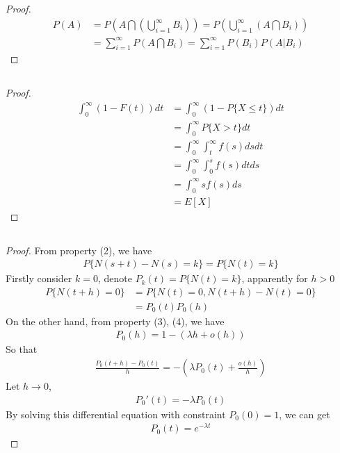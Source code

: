 \documentclass[runningheads]{llncs}
\begin{document}
    \subsection{}
    \begin{proof}
        \begin{align}
            P(A) &= P(A \bigcap (\bigcup_{i=1}^\infty B_i)) 
            = P(\bigcup_{i=1}^\infty (A \bigcap B_i)) \\
            &= \sum_{i=1}^\infty P(A \bigcap B_i)
            = \sum_{i=1}^\infty P(B_i) P(A | B_i)
        \end{align}
    \end{proof}
    \subsection{}
    \begin{proof}
        \begin{align}
            \int_0^\infty (1 - F(t))dt &= \int_0^\infty (1 - P\{ X \leq t \})dt \\
            &= \int_0^\infty P \{ X > t \}dt \\
            &= \int_0^\infty \int_t^\infty f(s)dsdt \\
            &= \int_0^\infty \int_0^s f(s) dt ds \\
            &= \int_0^\infty s f(s) ds \\
            &= E[X]
        \end{align}
    \end{proof}
    \subsection{}
    \begin{proof}
        From property (2), we have
        \begin{align}
            P \{ N(s + t) - N(s) = k \} = P \{ N(t) = k \}
        \end{align}
        Firstly consider $k = 0$, denote $P_k(t) = P \{ N(t) = k \}$,
        apparently for $h > 0$
        \begin{align}
            P \{ N(t + h) = 0 \} &= P \{ N(t) = 0, N(t + h) - N(t) = 0 \} \\
            &= P_0(t)P_0(h)
        \end{align}
        On the other hand, from property (3), (4), we have
        \begin{align}
            P_0(h) = 1 - (\lambda h + o(h))
        \end{align}
        So that
        \begin{align}
            \frac{P_0(t + h) - P_0(t)}{h} = -(\lambda P_0(t) + \frac{o(h)}{h})
        \end{align}
        Let $h \rightarrow 0$,
        \begin{align}
            P_0'(t) = - \lambda P_0(t)
        \end{align}
        By solving this differential equation with constraint $P_0(0) = 1$,
        we can get
        \begin{align}
            P_0(t) = e^{-\lambda t}
        \end{align}
    \end{proof}


    
\end{document}
